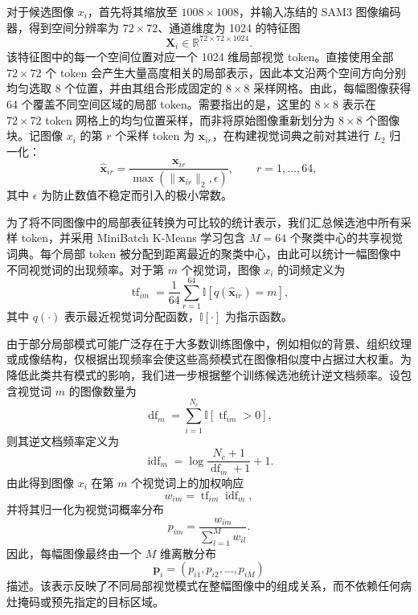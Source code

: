 \documentclass[UTF8,a4paper,10pt]{ctexart}
\begin{document}
对于候选图像 $x_i$，首先将其缩放至 $1008\times1008$，并输入冻结的 SAM3 图像编码器，得到空间分辨率为 $72\times72$、通道维度为 1024 的特征图
\begin{equation}
\mathbf{X}_i\in\mathbb{R}^{72\times72\times1024}.
\end{equation}
该特征图中的每一个空间位置对应一个 1024 维局部视觉 token。直接使用全部 $72\times72$ 个 token 会产生大量高度相关的局部表示，因此本文沿两个空间方向分别均匀选取 8 个位置，并由其组合形成固定的 $8\times8$ 采样网格。由此，每幅图像获得 64 个覆盖不同空间区域的局部 token。需要指出的是，这里的 $8\times8$ 表示在 $72\times72$ token 网格上的均匀位置采样，而非将原始图像重新划分为 $8\times8$ 个图像块。记图像 $x_i$ 的第 $r$ 个采样 token 为 $\mathbf{x}_{ir}$，在构建视觉词典之前对其进行 $L_2$ 归一化：
\begin{equation}
\widehat{\mathbf{x}}_{ir}
=
\frac{\mathbf{x}_{ir}}
{\max\left(\|\mathbf{x}_{ir}\|_2,\epsilon\right)},
\qquad
r=1,\ldots,64,
\end{equation}
其中 $\epsilon$ 为防止数值不稳定而引入的极小常数。

为了将不同图像中的局部表征转换为可比较的统计表示，我们汇总候选池中所有采样 token，并采用 MiniBatch K-Means 学习包含 $M=64$ 个聚类中心的共享视觉词典。每个局部 token 被分配到距离最近的聚类中心，由此可以统计一幅图像中不同视觉词的出现频率。对于第 $m$ 个视觉词，图像 $x_i$ 的词频定义为
\begin{equation}
\operatorname{tf}_{im}
=
\frac{1}{64}
\sum_{r=1}^{64}
\mathbb{I}
\left[
q\left(\widehat{\mathbf{x}}_{ir}\right)=m
\right],
\end{equation}
其中 $q(\cdot)$ 表示最近视觉词分配函数，$\mathbb{I}[\cdot]$ 为指示函数。

由于部分局部模式可能广泛存在于大多数训练图像中，例如相似的背景、组织纹理或成像结构，仅根据出现频率会使这些高频模式在图像相似度中占据过大权重。为降低此类共有模式的影响，我们进一步根据整个训练候选池统计逆文档频率。设包含视觉词 $m$ 的图像数量为
\begin{equation}
\operatorname{df}_m
=
\sum_{i=1}^{N_c}
\mathbb{I}
\left[
\operatorname{tf}_{im}>0
\right],
\end{equation}
则其逆文档频率定义为
\begin{equation}
\operatorname{idf}_m
=
\log
\frac{N_c+1}{\operatorname{df}_m+1}
+1.
\end{equation}
由此得到图像 $x_i$ 在第 $m$ 个视觉词上的加权响应
\begin{equation}
w_{im}
=
\operatorname{tf}_{im}\operatorname{idf}_m,
\end{equation}
并将其归一化为视觉词概率分布
\begin{equation}
p_{im}
=
\frac{w_{im}}
{\sum_{l=1}^{M}w_{il}}.
\end{equation}
因此，每幅图像最终由一个 $M$ 维离散分布
\begin{equation}
\mathbf{p}_i
=
\left(
p_{i1},
p_{i2},
\ldots,
p_{iM}
\right)
\end{equation}
描述。该表示反映了不同局部视觉模式在整幅图像中的组成关系，而不依赖任何病灶掩码或预先指定的目标区域。
\end{document}
